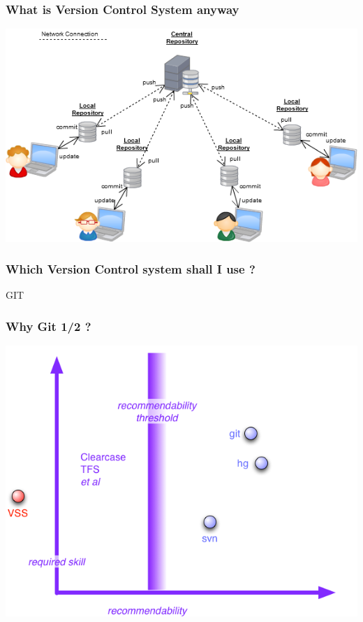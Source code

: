 

\begin{frame}
\frametitle{What is Version Control System anyway}
\includegraphics[height=0.9\textheight, width=\textwidth]{images/distributed}
\end{frame}


\begin{frame}
\frametitle{Which Version Control system shall I use ?}
\pause
\huge 
\begin{center}
GIT 
\end{center}
\end{frame}


\begin{frame}
\frametitle{Why Git 1/2 ?}
\includegraphics[height=0.9\textheight, width=\textwidth]{images/vcs-plane}
\end{frame}



